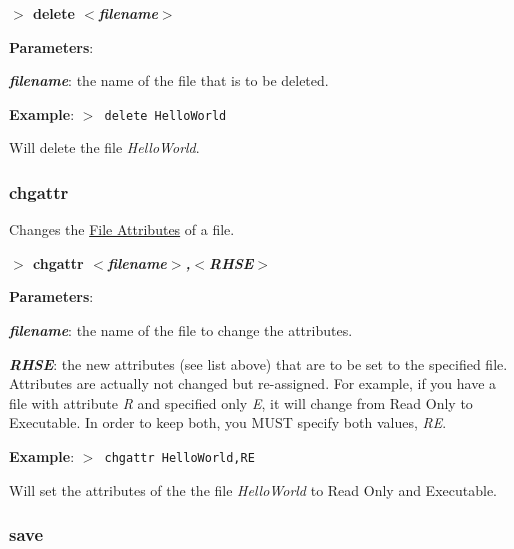         \hspace{1.9cm}\textbf{$>$ delete \textit{$<$filename$>$}}

        \textbf{Parameters}:

        \hspace{1cm}\textbf{\textit{filename}}: the name of the file that is to
        be deleted.
        
        \textbf{Example}: \texttt{$>$ delete HelloWorld}

        Will delete the file \textit{HelloWorld}.

        \subsubsection{{chgattr}}
        \label{cmd:chgattr}

        Changes the \hyperref[subsub:fileattr]{File Attributes} of a file.

        \hspace{1.9cm}\textbf{$>$ chgattr \textit{$<$filename$>$,$<$RHSE$>$}}

        \textbf{Parameters}:

        \hspace{1cm}\textbf{\textit{filename}}: the name of the file to change
        the attributes.

        \hspace{1cm}\textbf{\textit{RHSE}}: the new attributes (see list above)
        that are to be set to the specified file. Attributes are actually not
        changed but re-assigned. For example, if you have a file with attribute
        \textit{R} and specified only \textit{E}, it will change from Read Only
        to Executable. In order to keep both, you MUST specify both values,
        \textit{RE}.
        
        \textbf{Example}: \texttt{$>$ chgattr HelloWorld,RE}

        Will set the attributes of the the file \textit{HelloWorld} to Read Only
        and Executable.

        \subsubsection{{save}}
        \label{cmd:save}

